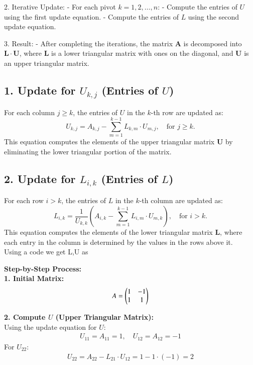 \documentclass[journal]{IEEEtran}
\begin{document}
2. Iterative Update:
   - For each pivot $ k = 1, 2, \ldots, n $:
     - Compute the entries of $ U $ using the first update equation.
     - Compute the entries of $ L $ using the second update equation.
   
3. Result:
   - After completing the iterations, the matrix $ \mathbf{A} $ is decomposed into $ \mathbf{L} \cdot \mathbf{U} $, where $ \mathbf{L} $ is a lower triangular matrix with ones on the diagonal, and $ \mathbf{U} $ is an upper triangular matrix.
\subsection*{1. Update for $ U_{k,j} $ (Entries of $ U $)}

For each column $ j \geq k $, the entries of $ U $ in the $ k $-th row are updated as:
\[
U_{k,j} = A_{k,j} - \sum_{m=1}^{k-1} L_{k,m} \cdot U_{m,j}, \quad \text{for } j \geq k.
\]
This equation computes the elements of the upper triangular matrix $ \mathbf{U} $ by eliminating the lower triangular portion of the matrix.

\subsection*{2. Update for $ L_{i,k} $ (Entries of $ L $)}

For each row $ i > k $, the entries of $ L $ in the $ k $-th column are updated as:
\[
L_{i,k} = \frac{1}{U_{k,k}} \left( A_{i,k} - \sum_{m=1}^{k-1} L_{i,m} \cdot U_{m,k} \right), \quad \text{for } i > k.
\]
This equation computes the elements of the lower triangular matrix $ \mathbf{L} $, where each entry in the column is determined by the values in the rows above it.\\
Using a code we get L,U as 

\textbf{Step-by-Step Process:}\\

\textbf{1. Initial Matrix:}
\begin{align}
    A = \begin{pmatrix}1&-1\\1&1\end{pmatrix}
\end{align}

\textbf{2. Compute $U$ (Upper Triangular Matrix):}\\
Using the update equation for $U$:
\begin{align}
    U_{11} = A_{11} = 1, \quad U_{12} = A_{12} = -1
\end{align}
For $U_{22}$:
\begin{align}
    U_{22} = A_{22} - L_{21} \cdot U_{12} = 1 - 1\cdot (-1) = 2
\end{align}
\end{document}
